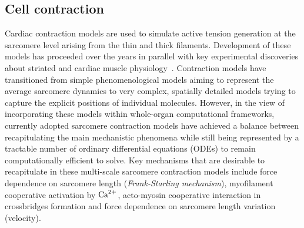 

%
%
%
\subsection{Cell contraction}\label{sec:cell_contr_modelling}
Cardiac contraction models are used to simulate active tension generation at the sarcomere level arising from the thin and thick filaments. Development of these models has proceeded over the years in parallel with key experimental discoveries about striated and cardiac muscle physiology~\cite{Niederer:2019}. Contraction models have transitioned from simple phenomenological models aiming to represent the average sarcomere dynamics to very complex, spatially detailed models trying to capture the explicit positions of individual molecules. However, in the view of incorporating these models within whole-organ computational frameworks, currently adopted sarcomere contraction models have achieved a balance between recapitulating the main mechanistic phenomena while still being represented by a tractable number of ordinary differential equations (\acs{ODE}s) to remain computationally efficient to solve. Key mechanisms that are desirable to recapitulate in these multi-scale sarcomere contraction models include force dependence on sarcomere length (\textit{Frank-Starling mechanism}), myofilament cooperative activation by $\textrm{Ca}^{2+}$, acto-myosin cooperative interaction in crossbridges formation and force dependence on sarcomere length variation (velocity).


